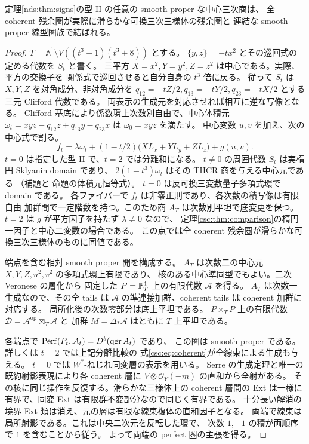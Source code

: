 \begin{proposition}[残る型の変形連結性]\label{nds:prop:sign-path}
定理\ref{nds:thm:signs}の型 II の任意の smooth proper な中心三次商は、
全 coherent 残余圏が実際に滑らかな可換三次三様体の残余圏と
連結な smooth proper 線型圏族で結ばれる。
\end{proposition}
\begin{proof}
$T=\mathbb A^1\setminus V((t^3-1)(t^3+8))$ とする。
$\{y,z\}=-t x^2$ とその巡回式の定める代数を $S_t$ と書く。
三平方 $X=x^2,Y=y^2,Z=z^2$ は中心である。実際、平方の交換子を
関係式で巡回させると自分自身の $t^3$ 倍に戻る。
従って $S_t$ は $X,Y,Z$ を対角成分、非対角成分を
$q_{12}=-tZ/2,q_{13}=-tY/2,q_{23}=-tX/2$ とする三元 Clifford 代数である。
両表示の生成元を対応させれば相互に逆な写像となる。
Clifford 基底により係数環上次数別自由で、中心体積元
$\omega_t=xyz-q_{12}z+q_{13}y-q_{23}x$ は $\omega_0=xyz$ を満たす。
中心変数 $u,v$ を加え、次の中心式で割る。
\[
 f_t=\lambda\omega_t+(1-t/2)\bigl(XL_x+YL_y+ZL_z\bigr)+g(u,v).
\]
$t=0$ は指定した型 II で、$t=2$ では分離和になる。
$t\ne0$ の周囲代数 $S_t$ は実楕円 Sklyanin domain であり、
$2(1-t^3)\omega_t$ はその THCR 商を与える中心元である
（補題と
命題の体積元恒等式）。
$t=0$ は反可換三変数量子多項式環で domain である。
各ファイバーで $f_t$ は非零正則であり、各次数の積写像は有限自由
加群間で一定階数を持つ。このため商 $A_T$ は次数別平坦で底変更を保つ。
$t=2$ は $g$ が平方因子を持たず $\lambda\ne0$ なので、
定理\ref{csc:thm:comparison}の楕円一因子と中心二変数の場合である。
この点では全 coherent 残余圏が滑らかな可換三次三様体のものに同値である。

端点を含む相対 smooth proper 開を構成する。
$A_T$ は次数二の中心元 $X,Y,Z,u^2,v^2$ の多項式環上有限であり、
核のある中心準同型でもよい。二次 Veronese の層化から
固定した $P=\mathbb P^4_T$ 上の有限代数 $\mathcal A$ を得る。
$A_T$ は次数一生成なので、その全 tails は
$\mathcal A$ の準連接加群、coherent tails は coherent 加群に対応する。
局所化後の次数零部分は底上平坦である。
$P\times_T P$ 上の有限代数
$\mathcal D=\mathcal A^{\mathrm{op}}\boxtimes_T\mathcal A$ と
加群 $M=\Delta_*\mathcal A$ はともに $T$ 上平坦である。

各端点で $\operatorname{Perf}(P_t,\mathcal A_t)=D^b(\operatorname{qgr} A_t)$ であり、
この圏は smooth proper である。詳しくは $t=2$ では上記分離比較の
式\eqref{csc:eq:coherent}が全線束による生成も与える。
$t=0$ では $W^*$-ねじれ同変層の表示を用いる。
Serre の生成定理と唯一の既約射影表現により各 coherent 層に
$V\otimes\mathcal O_Y(-m)$ の直和から全射がある。
その核に同じ操作を反復する。滑らかな三様体上の coherent 層間の
Ext は一様に有界で、同変 Ext は有限群不変部分なので同じく有界である。
十分長い解消の境界 Ext 類は消え、元の層は有限な線束複体の直和因子となる。
両端で線束は局所射影である。これは中央二次元を反転した環で、
次数 $1,-1$ の積が両順序で $1$ を含むことから従う。
よって両端の perfect 圏の主張を得る。


\end{proof}
